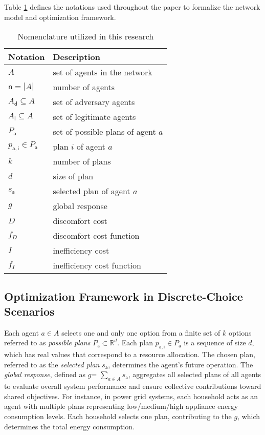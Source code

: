 \documentclass[journal]{IEEEtran}
\newcommand{\Agents}{\ensuremath{A }}
\newcommand{\NumAgents}{\ensuremath{\mathsf{n}}}
\newcommand{\AdversaryAgents}{\ensuremath{A_\mathsf{d}}}
\newcommand{\LegitimateAgents}{\ensuremath{A_\mathsf{l}}}
\newcommand{\PossiblePlans}{\ensuremath{P_\mathsf{a}}}
\newcommand{\Plan}{\ensuremath{p_\mathsf{a,i}}}
\newcommand{\SelectedPlan}{\ensuremath{s_\mathsf{a}}}
\newcommand{\GlobalResponse}{\ensuremath{g}}
\newcommand{\DiscomfortCost}{\ensuremath{D}}
\newcommand{\DiscomfortFunction}{\ensuremath{f_D}}
\newcommand{\InefficiencyCost}{\ensuremath{I}}
\newcommand{\InefficiencyFunction}{\ensuremath{f_I}}
\newcommand{\NumPlans}{\ensuremath{k}}
\newcommand{\PlanSize}{\ensuremath{d}}
\begin{document}
Table \ref{t2} defines the notations used throughout the paper to formalize the network model and optimization framework.

\begin{table}[htbp]
 \caption{Nomenclature utilized in this research}
    \label{t2}
     \centering
    \begin{tabular}{ll}
    \toprule
    \textbf{Notation} & \textbf{Description} \\
    \midrule
    \Agents  & set of agents in the network \\
    \NumAgents$ = |\Agents|$  & number of agents  \\
    $\AdversaryAgents \subseteq \Agents$ & set of adversary agents  \\
    $\LegitimateAgents \subseteq \Agents$  & set of legitimate agents \\
    \PossiblePlans & set of possible plans of agent $a$  \\
    \Plan$ \in \PossiblePlans$ & plan $i$ of agent $a$ \\
    \NumPlans & number of plans \\
    \PlanSize & size of plan \\ 
    \SelectedPlan & selected plan of agent $a$ \\
    \GlobalResponse & global response \\
    \DiscomfortCost & discomfort cost \\
    \DiscomfortFunction & discomfort cost function \\
    \InefficiencyCost & inefficiency cost \\
    \InefficiencyFunction & inefficiency cost function\\
    \bottomrule
    \end{tabular}
\end{table}

\subsection{Optimization Framework in Discrete-Choice Scenarios}
Each agent \(a \in \Agents\) selects one and only one option from a finite set of \NumPlans{} options referred to as \textit{possible plans} \PossiblePlans \(\subset \mathbb{R}^d\). Each plan \Plan \(\in \PossiblePlans\) is a sequence of size \PlanSize, which has real values that correspond to a resource allocation. The chosen plan, referred to as the \textit{selected plan} \SelectedPlan, determines the agent's future operation. The \textit{global response}, defined as \GlobalResponse = \(\sum_{a \in \Agents} \SelectedPlan\), aggregates all selected plans of all agents to evaluate overall system performance and ensure collective contributions toward shared objectives. For instance, in power grid systems, each household acts as an agent with multiple plans representing low/medium/high appliance energy consumption levels. Each household selects one plan, contributing to the \GlobalResponse, which determines the total energy consumption.
\end{document}
